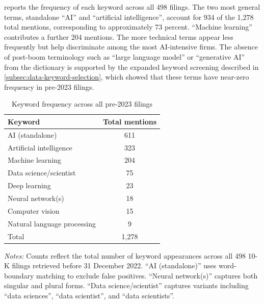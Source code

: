  reports the frequency of each keyword across all 498 filings. The two most general terms, standalone ``AI'' and ``artificial intelligence'', account for 934 of the 1,278 total mentions, corresponding to approximately 73 percent. ``Machine learning'' contributes a further 204 mentions. The more technical terms appear less frequently but help discriminate among the most AI-intensive firms. The absence of post-boom terminology such as ``large language model'' or ``generative AI'' from the dictionary is supported by the expanded keyword screening described in \cref{subsec:data-keyword-selection}, which showed that these terms have near-zero frequency in pre-2023 filings.

\begin{table}[htbp]
\centering
\caption{Keyword frequency across all pre-2023 filings}
\label{tab:keyword-frequency}
\small
\begin{threeparttable}
\begin{tabular}{lc}
\toprule
Keyword & Total mentions \\
\midrule
AI (standalone)              & 611 \\
Artificial intelligence      & 323 \\
Machine learning             & 204 \\
Data science/scientist       & 75 \\
Deep learning                & 23 \\
Neural network(s)            & 18 \\
Computer vision              & 15 \\
Natural language processing  & 9 \\
\midrule
Total                        & 1,278 \\
\bottomrule
\end{tabular}
\begin{tablenotes}[flushleft]
\footnotesize
\item \textit{Notes:} Counts reflect the total number of keyword appearances across all 498 10-K filings retrieved before 31 December 2022. ``AI (standalone)'' uses word-boundary matching to exclude false positives. ``Neural network(s)'' captures both singular and plural forms. ``Data science/scientist'' captures variants including ``data sciences'', ``data scientist'', and ``data scientists''.
\end{tablenotes}
\end{threeparttable}
\end{table}